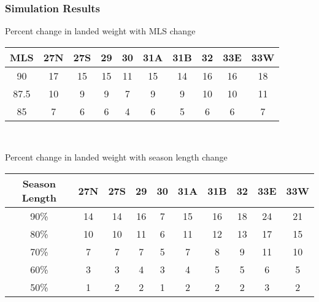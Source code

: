 \documentclass{beamer}
\begin{document}
\begin{frame}
\frametitle{Simulation Results}
Percent change in  landed weight  with MLS change 
\centering
\begin{tabular}{|c|c|c|c|c|c|c|c|c|c|}
\hline
MLS & 27N & 27S & 29 & 30 & 31A & 31B & 32 & 33E & 33W \\
\hline
90 & 17 & 15 & 15 & 11 & 15 & 14 & 16 & 16 & 18 \\
\hline
87.5 & 10 & 9  & 9  & 7  & 9  & 9  & 10 & 10 & 11 \\
\hline
85 & 7  & 6  & 6  & 4  & 6  & 5  & 6  & 6 & 7 \\
\hline
 
\end{tabular}\\
\vspace{5mm}

Percent change in  landed weight with season length change 
\centering
\begin{tabular}{|c|c|c|c|c|c|c|c|c|c|}
\hline
Season Length & 27N & 27S & 29 & 30 & 31A & 31B & 32 & 33E & 33W \\
\hline
90\% & 14 & 14 & 16 & 7 & 15 & 16 & 18 & 24 & 21 \\
\hline
80\% & 10 & 10 & 11 & 6 & 11 & 12 & 13 & 17 & 15 \\
\hline
70\% & 7  & 7  & 7  & 5 & 7  & 8  & 9  & 11 & 10 \\
\hline
60\% & 3  & 3  & 4  & 3 & 4  & 5  & 5  & 6  & 5  \\
\hline
50\% & 1  & 2  & 2  & 1 & 2  & 2  & 2  & 3  & 2  \\
\hline
 
\end{tabular}
\end{frame}
 
\end{document}
